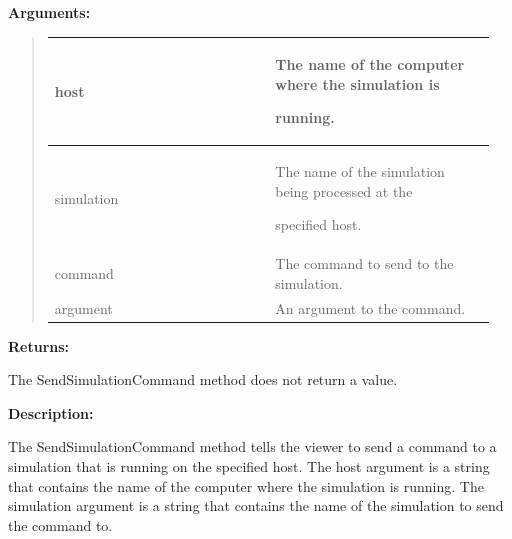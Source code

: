 \documentclass[letterpaper,10pt,english]{sphinxmanual}
\begin{document}
\begin{DUlineblock}{0em}
\item[] 
\item[] \textbf{Arguments:}
\end{DUlineblock}
\begin{quote}

\begin{tabular}{|p{0.475\linewidth}|p{0.475\linewidth}|}
\hline

host
 & 
\begin{DUlineblock}{0em}
\item[] The name of the computer where the simulation is
\item[] running.
\end{DUlineblock}
\\
\hline
simulation
 & 
\begin{DUlineblock}{0em}
\item[] The name of the simulation being processed at the
\item[] specified host.
\end{DUlineblock}
\\
\hline
command
 & 
The command to send to the simulation.
\\
\hline
argument
 & 
An argument to the command.
\\
\hline\end{tabular}

\end{quote}

\begin{DUlineblock}{0em}
\item[] 
\item[] \textbf{Returns:}
\item[] The SendSimulationCommand method does not return a value.
\item[] 
\item[] \textbf{Description:}
\item[] The SendSimulationCommand method tells the viewer to send a command to a
simulation that is running on the specified host. The host argument is a
string that contains the name of the computer where the simulation is
running. The simulation argument is a string that contains the name of the
simulation to send the command to.
\end{DUlineblock}

\begin{DUlineblock}{0em}
\item[] 
\end{DUlineblock}
\end{document}
